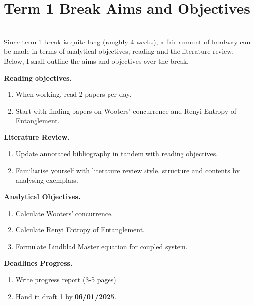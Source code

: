 \documentclass{article}
\begin{document}
\section*{Term 1 Break Aims and Objectives}
\\

Since term 1 break is quite long (roughly 4 weeks), a fair amount of headway can be made in terms of analytical objectives, reading and the literature review. Below, I shall outline the aims and objectives over the break.

\vspace{0.5cm}

\textbf{Reading objectives.}
\begin{enumerate}
    \item When working, read 2 papers per day.
    \item Start with finding papers on Wooters' concurrence and Renyi Entropy of Entanglement.
\end{enumerate}


\vspace{0.5cm}


\textbf{Literature Review.} 
\begin{enumerate}
    \item Update annotated bibliography in tandem with reading objectives.
    \item Familiarise yourself with literature review style, structure and contents by analysing exemplars.
\end{enumerate}


\vspace{0.5cm}


\textbf{Analytical Objectives.}
\begin{enumerate}
    \item Calculate Wooters' concurrence.
    \item Calculate Renyi Entropy of Entanglement.
    \item Formulate Lindblad Master equation for coupled system. 
\end{enumerate}


\vspace{0.5cm}


\textbf{Deadlines Progress.}
\begin{enumerate}
    \item Write progress report (3-5 pages).
    \item Hand in draft 1 by \textbf{06/01/2025}.
\end{enumerate}
\end{document}

